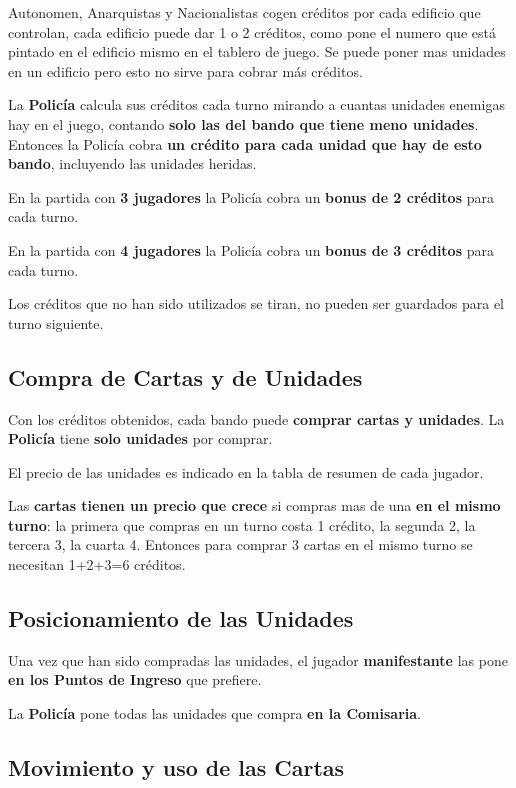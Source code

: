 \documentclass[a4paper,13pt]{scrartcl}
\begin{document}
Autonomen, Anarquistas y Nacionalistas cogen cr\'editos por cada edificio que controlan, cada edificio puede dar 1 o 2
cr\'editos, como pone el numero que est\'a pintado en el edificio mismo en el tablero de juego. Se puede poner mas
unidades en un edificio pero esto no sirve para cobrar m\'as cr\'editos.

La \textbf{Polic\'ia} calcula sus cr\'editos cada turno mirando a cuantas unidades enemigas hay en el juego, contando \textbf{solo las
del bando que tiene meno unidades}. Entonces la Polic\'ia cobra \textbf{un cr\'edito para cada unidad que hay de esto bando},
incluyendo las unidades heridas.

En la partida con \textbf{3 jugadores} la Polic\'ia cobra un \textbf{bonus de 2 cr\'editos} para cada turno.

En la partida con \textbf{4 jugadores} la Polic\'ia cobra un \textbf{bonus de 3 cr\'editos} para cada turno.

Los cr\'editos que no han sido utilizados se tiran, no pueden ser guardados para el turno siguiente.

\subsection{Compra de Cartas y de Unidades}
Con los cr\'editos obtenidos, cada bando puede \textbf{comprar cartas y unidades}. La \textbf{Polic\'ia} tiene \textbf{solo unidades} por comprar.

El precio de las unidades es indicado en la tabla de resumen de cada jugador.

Las \textbf{cartas tienen un precio que crece} si compras mas de una \textbf{en el mismo turno}: la primera que compras en un turno costa
1 cr\'edito, la segunda 2, la tercera 3, la cuarta 4. Entonces para comprar 3 cartas en el mismo turno se necesitan
1+2+3=6 cr\'editos.

\subsection{Posicionamiento de las Unidades}
Una vez que han sido compradas las unidades, el jugador \textbf{manifestante} las pone \textbf{en los Puntos de Ingreso} que prefiere. 

La \textbf{Polic\'ia} pone todas las unidades que compra \textbf{en la Comisaria}.

\subsection{Movimiento y uso de las Cartas}
\end{document}
